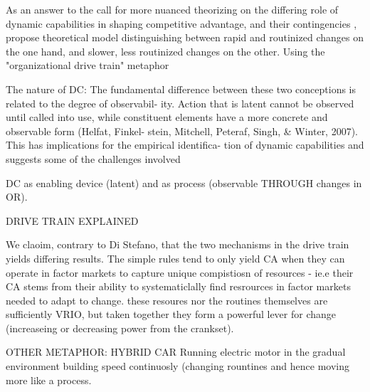 As an answer to the call for more nuanced theorizing on the differing role of dynamic
capabilities in shaping competitive advantage, and their contingencies
\citep{Peteraf2013}, \cite{DiStefano2014} propose theoretical model distinguishing between
rapid and routinized changes on the one hand, and slower, less routinized changes on the
other. Using the "organizational drive train" metaphor


The nature of DC: 
The fundamental difference between these two conceptions is related to the degree of observabil- ity. Action that is latent cannot be observed until called into use, while constituent elements have a more concrete and observable form (Helfat, Finkel- stein, Mitchell, Peteraf, Singh, & Winter, 2007). This has implications for the empirical identifica- tion of dynamic capabilities and suggests some of the challenges involved

DC as enabling device (latent) and as process (observable THROUGH changes in OR). 




DRIVE TRAIN EXPLAINED



We claoim, contrary to Di Stefano, that the two mechanisms in the drive train yields
differing results. The simple rules tend to only yield CA when they can operate in factor
markets to capture unique compistiosn of resources - ie.e their CA stems from their
ability to systematiclally find resrources in factor markets needed to adapt to
change. these resoures nor the routines themselves are sufficiently VRIO, but taken
together they form a powerful lever for change (increaseing or decreasing power from the
crankset).



OTHER METAPHOR: HYBRID CAR
Running electric motor in the gradual environment building speed continuosly (changing
rountines and hence moving more like a process.



